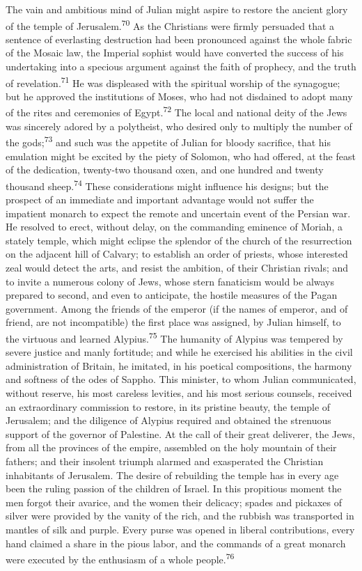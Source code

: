 The vain and ambitious mind of Julian might aspire to restore the
ancient glory of the temple of Jerusalem.\textsuperscript{70} As the Christians
were firmly persuaded that a sentence of everlasting destruction
had been pronounced against the whole fabric of the Mosaic law,
the Imperial sophist would have converted the success of his
undertaking into a specious argument against the faith of
prophecy, and the truth of revelation.\textsuperscript{71} He was displeased with
the spiritual worship of the synagogue; but he approved the
institutions of Moses, who had not disdained to adopt many of the
rites and ceremonies of Egypt.\textsuperscript{72} The local and national deity of
the Jews was sincerely adored by a polytheist, who desired only
to multiply the number of the gods;\textsuperscript{73} and such was the appetite
of Julian for bloody sacrifice, that his emulation might be
excited by the piety of Solomon, who had offered, at the feast of
the dedication, twenty-two thousand oxen, and one hundred and
twenty thousand sheep.\textsuperscript{74} These considerations might influence
his designs; but the prospect of an immediate and important
advantage would not suffer the impatient monarch to expect the
remote and uncertain event of the Persian war. He resolved to
erect, without delay, on the commanding eminence of Moriah, a
stately temple, which might eclipse the splendor of the church of
the resurrection on the adjacent hill of Calvary; to establish an
order of priests, whose interested zeal would detect the arts,
and resist the ambition, of their Christian rivals; and to invite
a numerous colony of Jews, whose stern fanaticism would be always
prepared to second, and even to anticipate, the hostile measures
of the Pagan government. Among the friends of the emperor (if the
names of emperor, and of friend, are not incompatible) the first
place was assigned, by Julian himself, to the virtuous and
learned Alypius.\textsuperscript{75} The humanity of Alypius was tempered by
severe justice and manly fortitude; and while he exercised his
abilities in the civil administration of Britain, he imitated, in
his poetical compositions, the harmony and softness of the odes
of Sappho. This minister, to whom Julian communicated, without
reserve, his most careless levities, and his most serious
counsels, received an extraordinary commission to restore, in its
pristine beauty, the temple of Jerusalem; and the diligence of
Alypius required and obtained the strenuous support of the
governor of Palestine. At the call of their great deliverer, the
Jews, from all the provinces of the empire, assembled on the holy
mountain of their fathers; and their insolent triumph alarmed and
exasperated the Christian inhabitants of Jerusalem. The desire of
rebuilding the temple has in every age been the ruling passion of
the children of Israel. In this propitious moment the men forgot
their avarice, and the women their delicacy; spades and pickaxes
of silver were provided by the vanity of the rich, and the
rubbish was transported in mantles of silk and purple. Every
purse was opened in liberal contributions, every hand claimed a
share in the pious labor, and the commands of a great monarch
were executed by the enthusiasm of a whole people.\textsuperscript{76}

